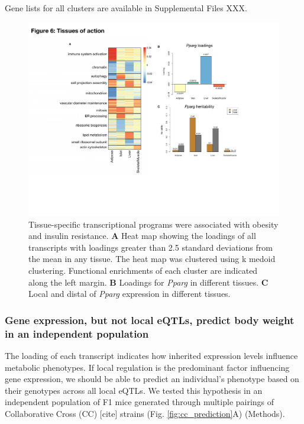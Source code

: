 \documentclass[
]{article}
\begin{document}
Gene lists for all clusters are available in Supplemental Files XXX.

\begin{figure}[ht!]
\includegraphics[width=\textwidth]{Figures/Fig6_TOA.pdf} 
\caption{Tissue-specific transcriptional programs were associated 
with obesity and insulin resistance. \textbf{A} Heat map showing 
the loadings of all transcripts with loadings greater than 2.5 
standard deviations from the mean in any tissue. The heat map was 
clustered using k medoid clustering. Functional enrichments of each 
cluster are indicated along the left margin. \textbf{B} Loadings for 
\textit{Pparg} in different tissues. \textbf{C} Local and distal of 
\textit{Pparg} expression in different tissues.
}
\label{fig:toa}
\end{figure}

\subsubsection{Gene expression, but not local eQTLs, predict body weight
in an independent
population}\label{gene-expression-but-not-local-eqtls-predict-body-weight-in-an-independent-population}

The loading of each transcript indicates how inherited expression levels
influence metabolic phenotypes. If local regulation is the predominant
factor influencing gene expression, we should be able to predict an
individual's phenotype based on their genotypes across all local eQTLs.
We tested this hypothesis in an independent population of F1 mice
generated through multiple pairings of Collaborative Cross (CC)
{[}cite{]} strains (Fig. \ref{fig:cc_prediction}A) (Methods).
\end{document}

